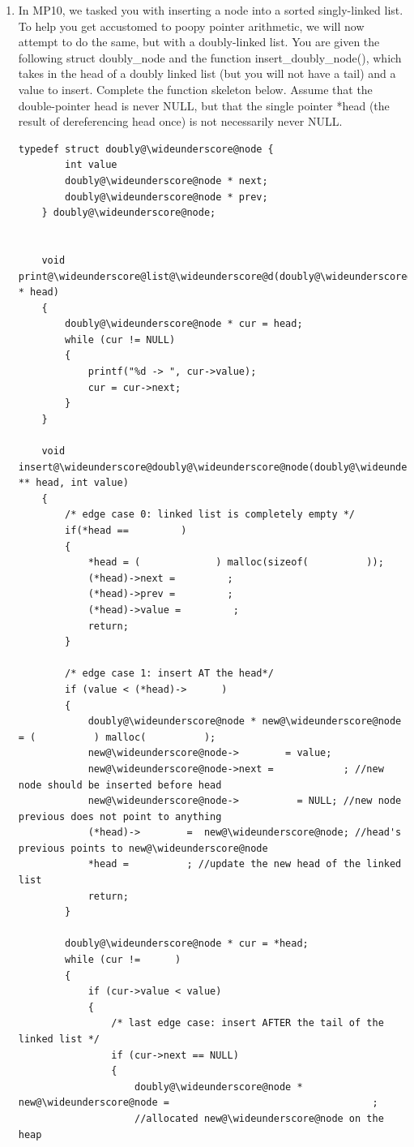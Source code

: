 \documentclass{article}
\begin{document}
\begin{enumerate}[label=(\alph*), itemsep = 120pt]
\begin{lstlisting}[style=CStyle]
\end{lstlisting}

\item In MP10, we tasked you with inserting a node into a sorted singly-linked list. To help you get accustomed to poopy pointer arithmetic, we will now attempt to do the same, but with a doubly-linked list. You are given the following struct doubly\_node and the function insert\_doubly\_node(), which takes in the head of a doubly linked list (but you will not have a tail) and a value to insert. Complete the function skeleton below. Assume that the double-pointer head is never NULL, but that the single pointer *head (the result of dereferencing head once) is not necessarily never NULL.

\begin{lstlisting}[style = CStyle]
    typedef struct doubly@\wideunderscore@node {
        int value
        doubly@\wideunderscore@node * next;
        doubly@\wideunderscore@node * prev;
    } doubly@\wideunderscore@node;


    void print@\wideunderscore@list@\wideunderscore@d(doubly@\wideunderscore@node * head)
    {
        doubly@\wideunderscore@node * cur = head;
        while (cur != NULL)
        {
            printf("%d -> ", cur->value);
            cur = cur->next;
        }
    }

    void insert@\wideunderscore@doubly@\wideunderscore@node(doubly@\wideunderscore@node ** head, int value) 
    {
        /* edge case 0: linked list is completely empty */
        if(*head ==         ) 
        {
            *head = (             ) malloc(sizeof(          ));
            (*head)->next =         ;
            (*head)->prev =         ;
            (*head)->value =         ;
            return;
        }

        /* edge case 1: insert AT the head*/
        if (value < (*head)->      )
        {
            doubly@\wideunderscore@node * new@\wideunderscore@node = (          ) malloc(          );
            new@\wideunderscore@node->        = value;
            new@\wideunderscore@node->next =            ; //new node should be inserted before head
            new@\wideunderscore@node->          = NULL; //new node previous does not point to anything
            (*head)->        =  new@\wideunderscore@node; //head's previous points to new@\wideunderscore@node
            *head =          ; //update the new head of the linked list
            return;
        }

        doubly@\wideunderscore@node * cur = *head;
        while (cur !=      )
        {
            if (cur->value < value)
            {
                /* last edge case: insert AFTER the tail of the linked list */
                if (cur->next == NULL)
                {
                    doubly@\wideunderscore@node * new@\wideunderscore@node =                                   ; 
                    //allocated new@\wideunderscore@node on the heap


\end{lstlisting}
\end{enumerate}
\end{document}
